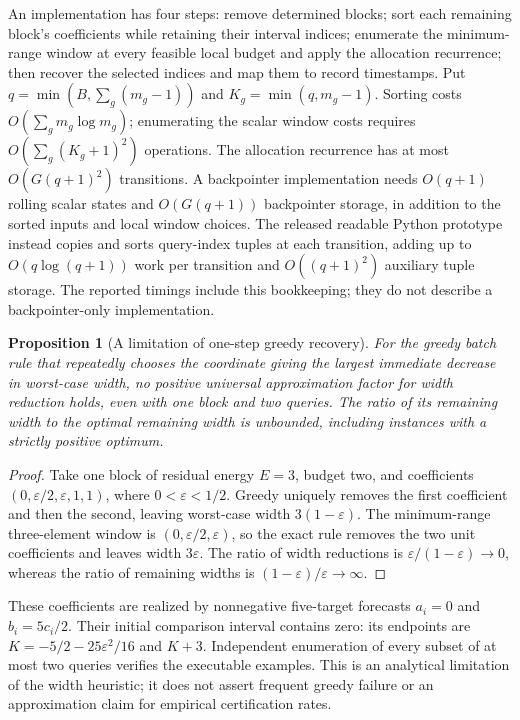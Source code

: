 \documentclass[12pt]{article}
\newtheorem{proposition}{Proposition}
\begin{document}
An implementation has four steps: remove determined blocks; sort each
remaining block's coefficients while retaining their interval indices;
enumerate the minimum-range window at every feasible local budget and
apply the allocation recurrence; then recover the selected indices and
map them to record timestamps. Put $q=\min(B,\sum_g(m_g-1))$ and
$K_g=\min(q,m_g-1)$. Sorting costs
$O(\sum_g m_g\log m_g)$; enumerating the scalar window costs requires
$O(\sum_g(K_g+1)^2)$ operations. The allocation recurrence has at most
$O(G(q+1)^2)$ transitions. A backpointer implementation needs $O(q+1)$
rolling scalar states and $O(G(q+1))$ backpointer storage, in addition to
the sorted inputs and local window choices. The released readable Python
prototype instead copies and sorts query-index tuples at each transition,
adding up to $O(q\log(q+1))$ work per transition and $O((q+1)^2)$
auxiliary tuple storage. The reported timings include this bookkeeping;
they do not describe a backpointer-only implementation.

\begin{proposition}[A limitation of one-step greedy recovery]
For the greedy batch rule that repeatedly chooses the coordinate giving
the largest immediate decrease in worst-case width, no positive universal
approximation factor for width reduction holds, even with one block and
two queries. The ratio of its remaining width to the optimal remaining
width is unbounded, including instances with a strictly positive optimum.
\end{proposition}
\begin{proof}
Take one block of residual energy $E=3$, budget two, and coefficients
$(0,\varepsilon/2,\varepsilon,1,1)$, where $0<\varepsilon<1/2$.
Greedy uniquely removes the first coefficient and then the second,
leaving worst-case width $3(1-\varepsilon)$. The minimum-range
three-element window is $(0,\varepsilon/2,\varepsilon)$, so the exact
rule removes the two unit coefficients and leaves width $3\varepsilon$.
The ratio of width reductions is
$\varepsilon/(1-\varepsilon)\to0$, whereas the ratio of remaining
widths is $(1-\varepsilon)/\varepsilon\to\infty$.
\end{proof}
These coefficients are realized by nonnegative five-target forecasts
$a_i=0$ and $b_i=5c_i/2$. Their initial comparison interval contains
zero: its endpoints are $K=-5/2-25\varepsilon^2/16$ and $K+3$.
Independent enumeration of every subset of at most two queries verifies
the executable examples. This is an analytical limitation of the width
heuristic; it does not assert frequent greedy failure or an approximation
claim for empirical certification rates.
\end{document}
